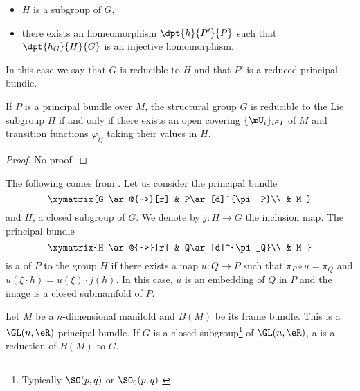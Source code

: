 																						\begin{itemize}
																						\item $H$ is a subgroup of $G$,
																						\item there exists an homeomorphism $\dpt{h}{P'}{P}$ such that $\dpt{h_G}{H}{G}$ is an injective homomorphism.
																						\end{itemize}

																						In this case we say that $G$ is reducible to $H$ and that $P'$ is a reduced principal bundle.

																						\begin{theorem}
																						If $P$ is a principal bundle over $M$, the structural group $G$ is reducible to the Lie subgroup $H$ if and only if there exists an open covering $\{ \mU_i \}_{i\in I}$ of $M$ and transition functions $\varphi_{ij}$ taking their values in $H$.
																						\end{theorem}
																						\begin{proof}
																						No proof.
																						\end{proof}
																						The following comes from \cite{Dieu4}. Let us consider the principal bundle
																						\begin{equation}
																						\xymatrix{%
																							G \ar@{~>}[r]		&	P\ar[d]^{\pi_P}\\
																								&	M
																						}
\end{equation}
and $H$, a closed subgroup of $G$. We denote by $j\colon H\to G$ the inclusion map. The principal bundle
\begin{equation}
\xymatrix{%
	H \ar@{~>}[r]		&	Q\ar[d]^{\pi_Q}\\
		&	M
}
\end{equation}
is a  of $P$ to the group $H$ if there exists a map $u\colon Q\to P$ such that $\pi_P\circ u=\pi_Q$ and $u(\xi\cdot h)=u(\xi)\cdot j(h)$. In this case, $u$ is an embedding of $Q$ in $P$ and the image is a closed submanifold of $P$.

Let $M$ be a $n$-dimensional manifold and $B(M)$ be its frame bundle. This is a $\GL(n,\eR)$-principal bundle. If $G$ is a closed subgroup\footnote{Typically $\SO(p,q)$ or $\SO_0(p,q)$.} of $\GL(n,\eR)$, a  is a reduction of $B(M)$ to $G$.

